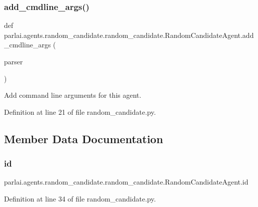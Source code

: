 \subsubsection{\texorpdfstring{add\+\_\+cmdline\+\_\+args()}{add\_cmdline\_args()}}
{\footnotesize\ttfamily def parlai.\+agents.\+random\+\_\+candidate.\+random\+\_\+candidate.\+Random\+Candidate\+Agent.\+add\+\_\+cmdline\+\_\+args (\begin{DoxyParamCaption}\item[{}]{parser }\end{DoxyParamCaption})\hspace{0.3cm}{\ttfamily [static]}}

\begin{DoxyVerb}Add command line arguments for this agent.\end{DoxyVerb}
 

Definition at line 21 of file random\+\_\+candidate.\+py.



\subsection{Member Data Documentation}
\mbox{\label{classparlai_1_1agents_1_1random__candidate_1_1random__candidate_1_1RandomCandidateAgent_adc2ff06b9b7e9463dc00dfa227fdc7d6}} 
\subsubsection{\texorpdfstring{id}{id}}
{\footnotesize\ttfamily parlai.\+agents.\+random\+\_\+candidate.\+random\+\_\+candidate.\+Random\+Candidate\+Agent.\+id}



Definition at line 34 of file random\+\_\+candidate.\+py.



